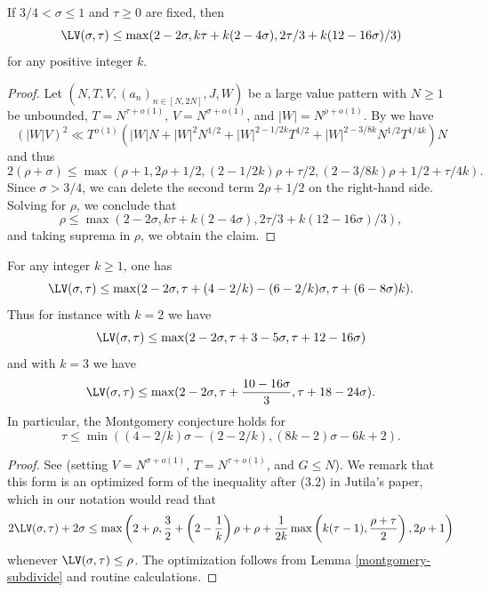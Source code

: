 \begin{lemma}\label{hb-lvt-2} If $3/4 < \sigma \leq 1$ and $\tau \geq 0$ are fixed, then
    $$ \LV(\sigma,\tau) \leq \max( 2-2\sigma, k\tau + k(2-4\sigma), 2\tau/3 + k(12-16\sigma)/3 )$$
    for any positive integer $k$.
    \end{lemma}

\begin{proof} Let $(N,T,V,(a_n)_{n \in [N,2N]},J,W)$ be a large value pattern with $N \geq 1$ be unbounded, $T = N^{\tau + o(1)}$,  $V = N^{\sigma + o(1)}$, and $|W| = N^{\rho+o(1)}$. By \cite[Lemma~6]{heathbrown_large_1979} we have
    $$ (|W| V)^2 \ll T^{o(1)}( |W|N + |W|^2 N^{1/2} + |W|^{2-1/2k} T^{1/2} + |W|^{2-3/8k} N^{1/2} T^{1/4k}) N$$
and thus
$$ 2(\rho + \sigma) \leq \max( \rho+1, 2\rho+1/2, (2-1/2k)\rho + \tau/2, (2-3/8k)\rho + 1/2 + \tau/4k).$$
Since $\sigma > 3/4$, we can delete the second term $2\rho+1/2$ on the right-hand side. Solving for $\rho$, we conclude that
$$ \rho \leq \max( 2-2\sigma, k\tau + k(2-4\sigma), 2\tau/3 + k(12-16\sigma)/3 ),$$
and taking suprema in $\rho$, we obtain the claim.
\end{proof}

\begin{theorem}\label{jutila-lvt}  For any integer $k \geq 1$, one has
$$ \LV(\sigma,\tau) \leq \max(2-2\sigma, \tau + (4-2/k) - (6-2/k)\sigma, \tau + (6-8\sigma)k).$$
Thus for instance with $k=2$ we have
$$ \LV(\sigma,\tau) \leq \max(2-2\sigma, \tau + 3 - 5\sigma, \tau + 12-16\sigma)$$
and with $k=3$ we have
$$ \LV(\sigma,\tau) \leq \max(2-2\sigma, \tau + \frac{10-16\sigma}{3}, \tau + 18-24\sigma).$$
In particular, the Montgomery conjecture holds for
$$ \tau \leq \min( (4-2/k)\sigma - (2-2/k), (8k-2)\sigma - 6k + 2).$$
\end{theorem}

\literature
{}

\begin{proof} See \cite[(1.4)]{jutila_zero_density_1977} (setting $V = N^{\sigma+o(1)}$, $T = N^{\tau+o(1)}$, and $G \leq N$).  We remark that this form is an optimized form of the inequality after (3.2) in Jutila's paper, which in our notation would read that
$$ 2\LV(\sigma,\tau) + 2\sigma \leq \max \left(2 + \rho, \frac{3}{2} + \left(2 - \frac{1}{k}\right)\rho + \rho + \frac{1}{2k}\max\left(k(\tau-1), \frac{\rho+\tau}{2}\right), 2\rho + 1\right)$$
whenever $\LV(\sigma,\tau) \leq \rho$.  The optimization follows from Lemma \ref{montgomery-subdivide} and routine calculations.
\end{proof}

